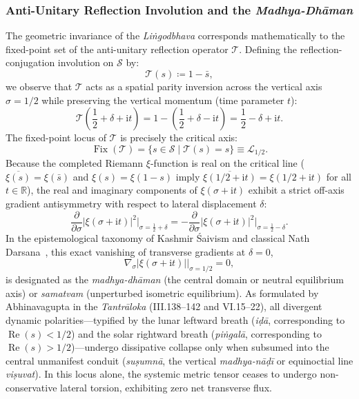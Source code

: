 \documentclass[11pt,a4paper,reqno]{article}
\theoremstyle{plain}
\theoremstyle{definition}
\theoremstyle{remark}
\numberwithin{equation}{section}
\begin{document}
\subsubsection{Anti-Unitary Reflection Involution and the \emph{Madhya-Dh\={a}man}}
The geometric invariance of the \emph{Li\.{n}godbhava} corresponds mathematically to the fixed-point set of the anti-unitary reflection operator $\mathcal{T}$. Defining the reflection-conjugation involution on $\mathcal{S}$ by:
\begin{equation}
  \mathcal{T}(s) \coloneqq 1 - \bar{s},
  \label{eq:involution_tau}
\end{equation}
we observe that $\mathcal{T}$ acts as a spatial parity inversion across the vertical axis $\sigma = 1/2$ while preserving the vertical momentum (time parameter $t$):
\begin{equation}
  \mathcal{T}\left(\frac{1}{2} + \delta + \mathrm{i}t\right) = 1 - \left(\frac{1}{2} + \delta - \mathrm{i}t\right) = \frac{1}{2} - \delta + \mathrm{i}t.
\end{equation}
The fixed-point locus of $\mathcal{T}$ is precisely the critical axis:
\begin{equation}
  \operatorname{Fix}(\mathcal{T}) = \big\{ s \in \mathcal{S} \;\big|\; \mathcal{T}(s) = s \big\} \equiv \mathcal{L}_{1/2}.
\end{equation}
Because the completed Riemann $\xi$-function is real on the critical line ($\overline{\xi(s)} = \xi(\bar{s})$ and $\xi(s) = \xi(1 - s)$ imply $\overline{\xi(1/2 + \mathrm{i}t)} = \xi(1/2 + \mathrm{i}t)$ for all $t \in \mathbb{R}$), the real and imaginary components of $\xi(\sigma + \mathrm{i}t)$ exhibit a strict off-axis gradient antisymmetry with respect to lateral displacement $\delta$:
\begin{equation}
  \frac{\partial}{\partial \sigma} \big| \xi(\sigma + \mathrm{i}t) \big|^2 \Big|_{\sigma = \frac{1}{2} + \delta} = -\frac{\partial}{\partial \sigma} \big| \xi(\sigma + \mathrm{i}t) \big|^2 \Big|_{\sigma = \frac{1}{2} - \delta}.
  \label{eq:gradient_antisymmetry}
\end{equation}
In the epistemological taxonomy of Kashmir \'{S}aivism and classical Nath Darsana~\cite{NathDarsanaV2Monograph2026}, this exact vanishing of transverse gradients at $\delta = 0$,
\begin{equation}
  \left. \nabla_\sigma |\xi(\sigma + \mathrm{i}t)| \right|_{\sigma = 1/2} = 0,
\end{equation}
is designated as the \emph{madhya-dh\={a}man} (the central domain or neutral equilibrium axis) or \emph{samatvam} (unperturbed isometric equilibrium). As formulated by Abhinavagupta in the \emph{Tantr\={a}loka} (III.138--142 and VI.15--22), all divergent dynamic polarities---typified by the lunar leftward breath (\emph{i\d{d}\={a}}, corresponding to $\operatorname{Re}(s) < 1/2$) and the solar rightward breath (\emph{pi\.{n}gal\={a}}, corresponding to $\operatorname{Re}(s) > 1/2$)---undergo dissipative collapse only when subsumed into the central unmanifest conduit (\emph{su\d{s}umn\={a}}, the vertical \emph{madhya-n\={a}\d{d}\={i}} or equinoctial line \emph{vi\d{s}uvat}). In this locus alone, the systemic metric tensor ceases to undergo non-conservative lateral torsion, exhibiting zero net transverse flux.
\end{document}
